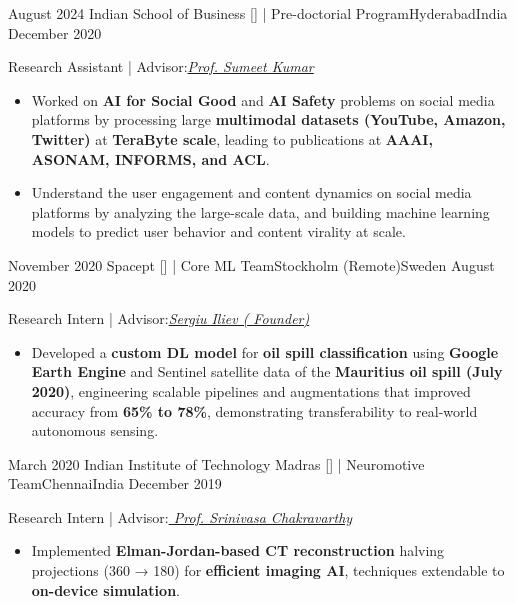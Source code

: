 \begin{experiences}
  \emptySeparator
    \experience
    {August 2024}   {Indian School of Business [\href{https://www.isb.edu/en.html}{\textcolor{basecolor}{\faGlobe}}] | Pre-doctorial Program}{Hyderabad}{India}
    {December 2020} {
                    Research Assistant | Advisor:\textit{\href{https://sumeetkumar.in/}{\textcolor{basecolor}{Prof. Sumeet Kumar}}
                    }
                      \begin{itemize}
                        \item Worked on \textbf{AI for Social Good} and \textbf{AI Safety} problems on social media platforms by processing large \textbf{multimodal datasets (YouTube, Amazon, Twitter)} at \textbf{TeraByte scale}, leading to publications at \textbf{AAAI, ASONAM, INFORMS, and ACL}.
                        \item Understand the user engagement and content dynamics on social media platforms by analyzing the large-scale data, and building machine learning models to predict user behavior and content virality at scale.
                      \end{itemize}
                    }{}
  \emptySeparator
    \experience
    {November 2020}   {Spacept [\href{https://spacept.com/}{\textcolor{basecolor}{\faGlobe}}] | Core ML Team}{Stockholm (Remote)}{Sweden}
    {August 2020} {
                    Research Intern | Advisor:\textit{\href{https://iliev.us/}{\textcolor{basecolor}{Sergiu Iliev ( Founder)}}
                    }
                      \begin{itemize}
                       \item Developed a \textbf{custom DL model} for \textbf{oil spill classification} using \textbf{Google Earth Engine} and Sentinel satellite data of the \textbf{Mauritius oil spill (July 2020)}, engineering scalable pipelines and augmentations that improved accuracy from \textbf{65\% to 78\%}, demonstrating transferability to real-world autonomous sensing.
                      \end{itemize}
                    }{}
  \emptySeparator
    \experience
    {March 2020}   {Indian Institute of Technology Madras [\href{https://www.iitm.ac.in/}{\textcolor{basecolor}{\faGlobe}}] | Neuromotive Team}{Chennai}{India}
    {December 2019} {
                    Research Intern | Advisor:\textit{\href{https://nvsteam.github.io/author/srinivasa-chakravarthy.-v/}{\textcolor{basecolor}{ Prof. Srinivasa Chakravarthy}}
                    }
                      \begin{itemize}
                        \item Implemented \textbf{Elman-Jordan-based CT reconstruction} halving projections (360 → 180) for \textbf{efficient imaging AI}, techniques extendable to \textbf{on-device simulation}.

\end{itemize}}
\end{experiences}

